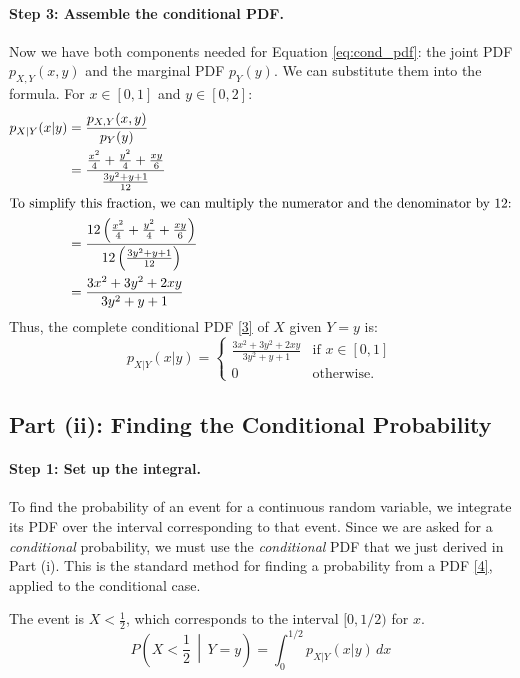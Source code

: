 \documentclass[11pt,a4paper]{article}
\begin{document}
\paragraph{Step 3: Assemble the conditional PDF.}
Now we have both components needed for Equation \ref{eq:cond_pdf}: the joint PDF $p_{X,Y}(x,y)$ and the marginal PDF $p_Y(y)$. We can substitute them into the formula. For $x \in [0,1]$ and $y \in [0,2]$:
\begin{align*}
p_{X|Y}(x|y) &= \frac{p_{X,Y}(x,y)}{p_Y(y)} \\
&= \frac{\frac{x^2}{4} + \frac{y^2}{4} + \frac{xy}{6}}{\frac{3y^2 + y + 1}{12}} \\
\intertext{To simplify this fraction, we can multiply the numerator and the denominator by 12:}
&= \frac{12 \left( \frac{x^2}{4} + \frac{y^2}{4} + \frac{xy}{6} \right)}{12 \left( \frac{3y^2 + y + 1}{12} \right)} \\
&= \frac{3x^2 + 3y^2 + 2xy}{3y^2 + y + 1}
\end{align*}
Thus, the complete conditional PDF \hyperlink{note3}{[3]} of $X$ given $Y=y$ is:
\[
p_{X|Y}(x|y) =
\begin{cases}
\frac{3x^2 + 3y^2 + 2xy}{3y^2 + y + 1} & \text{if } x \in [0,1] \\
0 & \text{otherwise.}
\end{cases}
\]

\subsection{Part (ii): Finding the Conditional Probability}

\paragraph{Step 1: Set up the integral.}
To find the probability of an event for a continuous random variable, we integrate its PDF over the interval corresponding to that event. Since we are asked for a \emph{conditional} probability, we must use the \emph{conditional} PDF that we just derived in Part (i). This is the standard method for finding a probability from a PDF \hyperlink{note4}{[4]}, applied to the conditional case.

The event is $X < \frac{1}{2}$, which corresponds to the interval $[0, 1/2)$ for $x$.
\[
P\left(X < \frac{1}{2} \, \middle| \, Y=y\right) = \int_{0}^{1/2} p_{X|Y}(x|y) \,dx
\]
\end{document}
